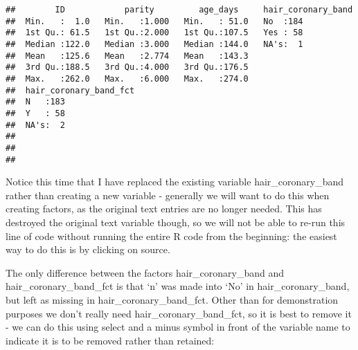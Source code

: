 \documentclass[
]{article}
\newenvironment{Shaded}{\begin{snugshade}}{\end{snugshade}}
\newcommand{\DataTypeTok}[1]{\textcolor[rgb]{0.13,0.29,0.53}{#1}}
\newcommand{\KeywordTok}[1]{\textcolor[rgb]{0.13,0.29,0.53}{\textbf{#1}}}
\newcommand{\NormalTok}[1]{#1}
\newcommand{\OperatorTok}[1]{\textcolor[rgb]{0.81,0.36,0.00}{\textbf{#1}}}
\newcommand{\StringTok}[1]{\textcolor[rgb]{0.31,0.60,0.02}{#1}}
\begin{document}
\begin{Shaded}
\end{Shaded}

\begin{verbatim}
##        ID            parity         age_days     hair_coronary_band
##  Min.   :  1.0   Min.   :1.000   Min.   : 51.0   No  :184          
##  1st Qu.: 61.5   1st Qu.:2.000   1st Qu.:107.5   Yes : 58          
##  Median :122.0   Median :3.000   Median :144.0   NA's:  1          
##  Mean   :125.6   Mean   :2.774   Mean   :143.3                     
##  3rd Qu.:188.5   3rd Qu.:4.000   3rd Qu.:176.5                     
##  Max.   :262.0   Max.   :6.000   Max.   :274.0                     
##  hair_coronary_band_fct
##  N   :183              
##  Y   : 58              
##  NA's:  2              
##                        
##                        
## 
\end{verbatim}

Notice this time that I have replaced the existing variable
hair\_coronary\_band rather than creating a new variable - generally we
will want to do this when creating factors, as the original text entries
are no longer needed. This has destroyed the original text variable
though, so we will not be able to re-run this line of code without
running the entire R code from the beginning: the easiest way to do this
is by clicking on source.

The only difference between the factors hair\_coronary\_band and
hair\_coronary\_band\_fct is that `n' was made into `No' in
hair\_coronary\_band, but left as missing in hair\_coronary\_band\_fct.
Other than for demonstration purposes we don't really need
hair\_coronary\_band\_fct, so it is best to remove it - we can do this
using select and a minus symbol in front of the variable name to
indicate it is to be removed rather than retained:
\end{document}
